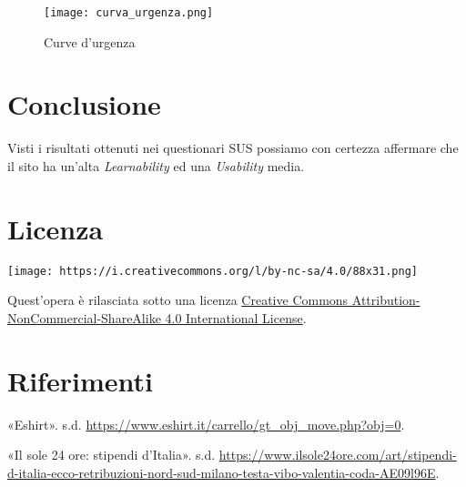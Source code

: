 \documentclass[12pt,italian,]{report}
\begin{document}
\begin{figure}
\centering
\texttt{[image: curva\_urgenza.png]}
\caption{Curve d'urgenza}
\end{figure}

\hypertarget{conclusione}{%
\chapter{Conclusione}\label{conclusione}}

Visti i risultati ottenuti nei questionari SUS possiamo con certezza
affermare che il sito ha un'alta \emph{Learnability} ed una
\emph{Usability} media.

\hypertarget{licenza}{%
\chapter{Licenza}\label{licenza}}

\texttt{[image: https://i.creativecommons.org/l/by-nc-sa/4.0/88x31.png]}

Quest'opera è rilasciata sotto una licenza
\href{https://creativecommons.org/licenses/by-nc-sa/4.0/}{Creative
Commons Attribution-NonCommercial-ShareAlike 4.0 International License}.

\hypertarget{riferimenti}{%
\chapter*{Riferimenti}\label{riferimenti}}

\hypertarget{refs}{}
\leavevmode\hypertarget{ref-eshirt}{}%
«Eshirt». s.d.
\url{https://www.eshirt.it/carrello/gt_obj_move.php?obj=0}.

\leavevmode\hypertarget{ref-redditomedio}{}%
«Il sole 24 ore: stipendi d'Italia». s.d.
\url{https://www.ilsole24ore.com/art/stipendi-d-italia-ecco-retribuzioni-nord-sud-milano-testa-vibo-valentia-coda-AE09l96E}.
\end{document}
